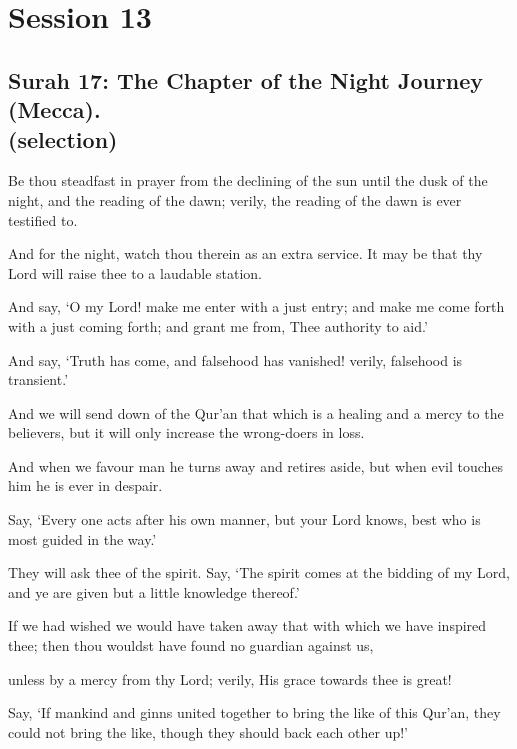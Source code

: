 \documentclass[fontsize=14pt, letterpaper, notitlepage, openany, DIV=12]{scrbook} %
\begin{document}
\clearpage
\chapter{Session 13}


\section[Surah 17: The Chapter of the Night Journey (Mecca).]{Surah 17: The Chapter of the Night Journey (Mecca).\\ (selection)}


\noindent[17:78]
Be thou steadfast in prayer from the declining of the sun until the dusk of the night, and
the reading of the dawn; verily, the reading of the dawn is ever testified to.

\noindent[17:79]
And for the night, watch thou therein as an extra service. It may be that thy Lord will
raise thee to a laudable station.

\noindent[17:80]
And say, `O my Lord! make me enter with a just entry; and make me come forth with a
just coming forth; and grant me from, Thee authority to aid.'

\noindent[17:81]
And say, `Truth has come, and falsehood has vanished! verily, falsehood is transient.'

\noindent[17:82]
And we will send down of the Qur'an that which is a healing and a mercy to the
believers, but it will only increase the wrong-doers in loss.

\noindent[17:83]
And when we favour man he turns away and retires aside, but when evil touches him he
is ever in despair.

\noindent[17:84]
Say, `Every one acts after his own manner, but your Lord knows, best who is most
guided in the way.'

\noindent[17:85]
They will ask thee of the spirit. Say, `The spirit comes at the bidding of my Lord, and ye
are given but a little knowledge thereof.'

\noindent[17:86]
If we had wished we would have taken away that with which we have inspired thee; then
thou wouldst have found no guardian against us,

\noindent[17:87]
unless by a mercy from thy Lord; verily, His grace towards thee is great!

\noindent[17:88]
Say, `If mankind and ginns united together to bring the like of this Qur'an, they could not
bring the like, though they should back each other up!'
\end{document}
